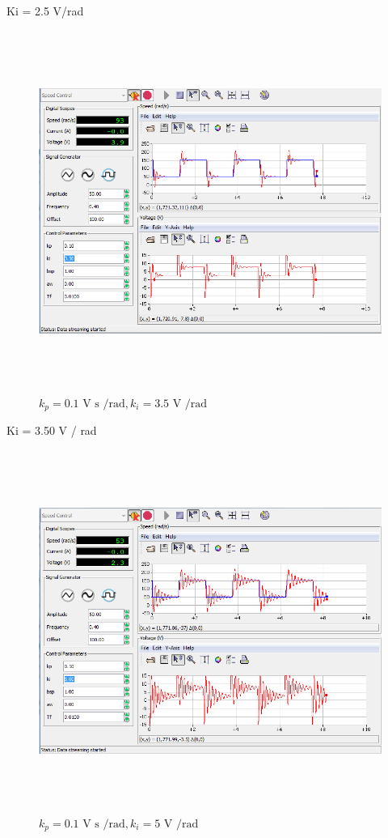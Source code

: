 \documentclass[]{article}
\begin{document}
Ki = 2.5 V/rad

\begin{figure}\includegraphics[width=6.50000in,height=4.63889in]{media/image49.png} \caption{$k_p = \text{0.1 V s /rad}, k_i = \text{3.5 V /rad}$} \end{figure}

Ki = 3.50 V / rad

\begin{figure}\includegraphics[width=6.50000in,height=4.65278in]{media/image51.png} \caption{$k_p = \text{0.1 V s /rad}, k_i = \text{5 V /rad}$} \end{figure}
\end{document}
